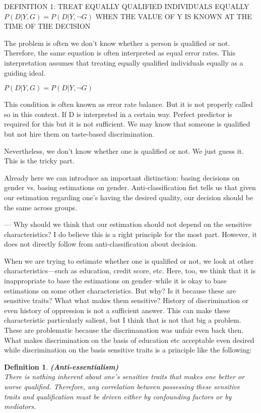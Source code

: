 \documentclass{article}
\newtheorem{definition}{Definition}
\begin{document}
DEFINITION 1: TREAT EQUALLY QUALIFIED INDIVIDUALS EQUALLY 
$ P(D|Y, G) =  P(D|Y, \neg G)$ WHEN THE VALUE OF Y IS KNOWN AT THE TIME OF THE DECISION

The problem is often we don't know whether a person is qualified or not. Therefore, the same equation is often interpreted as equal error rates. This interpretation assumes that treating equally qualified individuals equally as a guiding ideal.  

$ P(D|Y, G) =  P(D|Y, \neg G)$

This condition is often known as error rate balance. But it is not properly called so in this context. If D is interpreted in a certain way. Perfect predictor is required for this but it is not sufficient. We may know that someone is qualified but not hire them on taste-based discrimination. 

Nevertheless, we don't know whether one is qualified or not. We just guess it. This is the tricky part. 

Already here we can introduce an important distinction: basing decisions on gender vs. basing estimations on gender. Anti-classification fist tells us that given our estimation regarding one's having the desired quality, our decision should be the same across groups. 

--- Why should we think that our estimation should not depend on the sensitive characteristics? I do believe this is a right principle for the most part. However, it does not directly follow from anti-classification about decision. 


When we are trying to estimate whether one is qualified or not, we look at other characteristics---such as education, credit score, etc. Here, too, we think that it is inappropriate to base the estimations on gender--while it is okay to base estimations on some other characteristics. But why? Is it because these are sensitive traits? What what makes them sensitive? History of discrimination or even history of oppression is not a sufficient answer. This can make these characteristic particularly salient, but I think that is not that big a problem. These are problematic because the discrimanation was unfair even back then. What makes discrimination on the basis of education etc acceptable even desired while discrimination on the basis sensitive traits is a principle like the following:

\begin{definition}
\textup{\textbf{ (Anti-essentialism) } \\
There is nothing \textit{inherent} about one’s sensitive traits that makes one better or worse qualified. Therefore, any correlation between possessing these sensitive traits and qualification must be driven either by confounding factors or by mediators.}
\end{definition}
\end{document}
